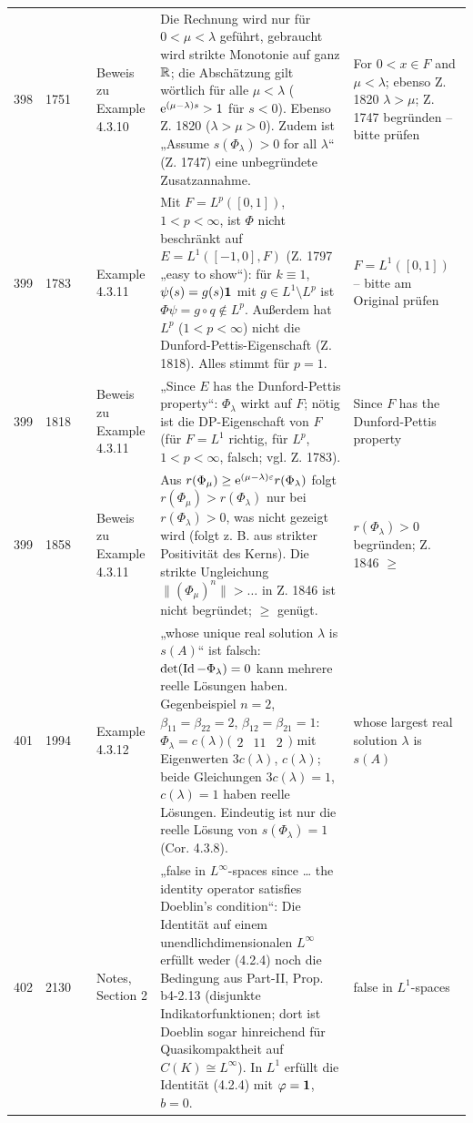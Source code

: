 \documentclass[10pt]{article}
\begin{document}
\begin{longtable}{@{}rrc>{\RaggedRight\arraybackslash}p{3.0cm}>{\RaggedRight\arraybackslash}p{11.4cm}>{\RaggedRight\arraybackslash}p{7.4cm}@{}}
398 & 1751 & \sichC{} & Beweis zu Example 4.3.10 & Die Rechnung wird nur für $0 < \mu < \lambda$ geführt, gebraucht wird strikte Monotonie auf ganz $\mathbb{R}$; die Abschätzung gilt wörtlich für alle $\mu < \lambda$ ($\mathrm{e}^{(\mu-\lambda)s} > 1$ für $s<0$). Ebenso Z. 1820 ($\lambda > \mu > 0$). Zudem ist „Assume $s(\Phi_{\lambda}) > 0$ for all $\lambda$“ (Z. 1747) eine unbegründete Zusatzannahme. & {For $0 < x \in F$ and $\mu < \lambda$}; ebenso Z. 1820 $\lambda > \mu$; Z. 1747 begründen – bitte prüfen \\[2pt]
399 & 1783 & \sichB{} & Example 4.3.11 & Mit $F = L^{p}([0,1])$, $1<p<\infty$, ist $\Phi$ nicht beschränkt auf $E = L^1([-1,0],F)$ (Z. 1797 „easy to show“): für $k \equiv 1$, $\psi(s) = g(s)\mathbf{1}$ mit $g \in L^1 \setminus L^p$ ist $\Phi\psi = g\circ q \notin L^p$. Außerdem hat $L^p$ ($1<p<\infty$) nicht die Dunford-Pettis-Eigenschaft (Z. 1818). Alles stimmt für $p = 1$. & $F = L^{1}([0,1])$ – bitte am Original prüfen \\[2pt]
399 & 1818 & \sichB{} & Beweis zu Example 4.3.11 & „Since $E$ has the Dunford-Pettis property“: $\Phi_\lambda$ wirkt auf $F$; nötig ist die DP-Eigenschaft von $F$ (für $F=L^1$ richtig, für $L^p$, $1<p<\infty$, falsch; vgl. Z. 1783). & {Since $F$ has the Dunford-Pettis property} \\[2pt]
399 & 1858 & \sichC{} & Beweis zu Example 4.3.11 & Aus $r(\Phi_{\mu}) \geq \eu^{(\mu-\lambda)\epsilon}r(\Phi_{\lambda})$ folgt $r(\Phi_\mu) > r(\Phi_\lambda)$ nur bei $r(\Phi_{\lambda}) > 0$, was nicht gezeigt wird (folgt z. B. aus strikter Positivität des Kerns). Die strikte Ungleichung $\|(\Phi_{\mu})^n\| > \ldots$ in Z. 1846 ist nicht begründet; $\geq$ genügt. & $r(\Phi_\lambda) > 0$ begründen; Z. 1846 $\geq$ \\[2pt]
401 & 1994 & \sichA{} & Example 4.3.12 & „whose unique real solution $\lambda$ is $s(A)$“ ist falsch: $\det(\operatorname{Id}-\Phi_\lambda)=0$ kann mehrere reelle Lösungen haben. Gegenbeispiel $n=2$, $\beta_{11}=\beta_{22}=2$, $\beta_{12}=\beta_{21}=1$: $\Phi_\lambda = c(\lambda)\bigl(\begin{smallmatrix}2&1 1&2\end{smallmatrix}\bigr)$ mit Eigenwerten $3c(\lambda)$, $c(\lambda)$; beide Gleichungen $3c(\lambda)=1$, $c(\lambda)=1$ haben reelle Lösungen. Eindeutig ist nur die reelle Lösung von $s(\Phi_\lambda)=1$ (Cor. 4.3.8). & {whose largest real solution $\lambda$ is $s(A)$} \\[2pt]
402 & 2130 & \sichB{} & Notes, Section 2 & „false in $L^{\infty}$-spaces since \dots{} the identity operator satisfies Doeblin's condition“: Die Identität auf einem unendlichdimensionalen $L^\infty$ erfüllt weder (4.2.4) noch die Bedingung aus Part-II, Prop. b4-2.13 (disjunkte Indikatorfunktionen; dort ist Doeblin sogar hinreichend für Quasikompaktheit auf $C(K) \cong L^\infty$). In $L^1$ erfüllt die Identität (4.2.4) mit $\phi = \1$, $b=0$. & {false in $L^{1}$-spaces} \\
\end{longtable}
\end{document}
